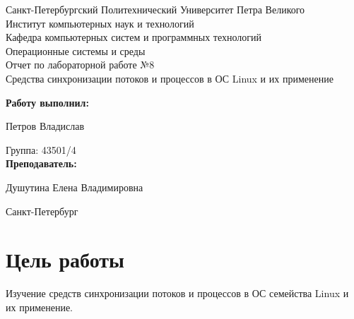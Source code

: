 \documentclass[a4paper]{article}
\begin{document}
\begin{titlepage} %

\begin{center} %

\large Санкт-Петербургский Политехнический Университет Петра Великого\\
\large Институт компьютерных наук и технологий \\
\large Кафедра компьютерных систем и программных технологий\\[6cm]

\huge Операционные системы и среды\\[0.5cm]
\large Отчет по лабораторной работе №8\\[0.1cm]
\large Средства синхронизации потоков и процессов в ОС Linux и
их применение\\[5cm]
\end{center}

\begin{flushright}
\begin{minipage}{0.5\textwidth}
\begin{flushright}
\textbf{Работу выполнил:}

Петров Владислав

{Группа:} 43501/4\\


\textbf{Преподаватель:} 

Душутина Елена Владимировна
\end{flushright}
\end{minipage} %
\end{flushright} %

\vfill %

\begin{center}

\large Санкт-Петербург\\
\large \the\year %

\end{center} %

\thispagestyle{empty} %
\end{titlepage} %

\vfill %


\section{Цель работы}
	Изучение средств синхронизации потоков и процессов в ОС семейства Linux и
их применение.
	
\end{document}
